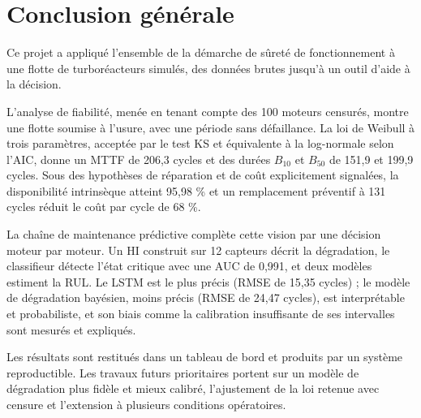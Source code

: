 \chapter*{Conclusion générale}

Ce projet a appliqué l'ensemble de la démarche de sûreté de fonctionnement à une flotte de turboréacteurs simulés, des données brutes jusqu'à un outil d'aide à la décision.

L'analyse de fiabilité, menée en tenant compte des 100 moteurs censurés, montre une flotte soumise à l'usure, avec une période sans défaillance. La loi de Weibull à trois paramètres, acceptée par le test KS et équivalente à la log-normale selon l'AIC, donne un MTTF de 206,3 cycles et des durées $B_{10}$ et $B_{50}$ de 151,9 et 199,9 cycles. Sous des hypothèses de réparation et de coût explicitement signalées, la disponibilité intrinsèque atteint 95,98 \% et un remplacement préventif à 131 cycles réduit le coût par cycle de 68 \%.

La chaîne de maintenance prédictive complète cette vision par une décision moteur par moteur. Un HI construit sur 12 capteurs décrit la dégradation, le classifieur détecte l'état critique avec une AUC de 0,991, et deux modèles estiment la RUL. Le LSTM est le plus précis (RMSE de 15,35 cycles) ; le modèle de dégradation bayésien, moins précis (RMSE de 24,47 cycles), est interprétable et probabiliste, et son biais comme la calibration insuffisante de ses intervalles sont mesurés et expliqués.

Les résultats sont restitués dans un tableau de bord et produits par un système reproductible. Les travaux futurs prioritaires portent sur un modèle de dégradation plus fidèle et mieux calibré, l'ajustement de la loi retenue avec censure et l'extension à plusieurs conditions opératoires.
